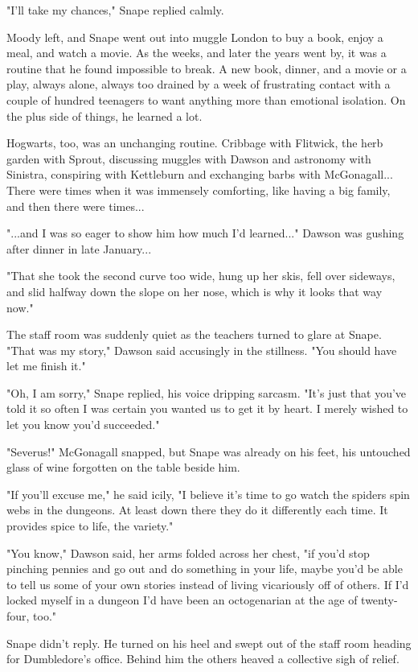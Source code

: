 "I'll take my chances," Snape replied calmly.

Moody left, and Snape went out into muggle London to buy a book, enjoy a meal, and watch a movie. As the weeks, and later the years went by, it was a routine that he found impossible to break. A new book, dinner, and a movie or a play, always alone, always too drained by a week of frustrating contact with a couple of hundred teenagers to want anything more than emotional isolation. On the plus side of things, he learned a lot.

Hogwarts, too, was an unchanging routine. Cribbage with Flitwick, the herb garden with Sprout, discussing muggles with Dawson and astronomy with Sinistra, conspiring with Kettleburn and exchanging barbs with McGonagall... There were times when it was immensely comforting, like having a big family, and then there were times...

"...and I was so eager to show him how much I'd learned..." Dawson was gushing after dinner in late January...

"That she took the second curve too wide, hung up her skis, fell over sideways, and slid halfway down the slope on her nose, which is why it looks that way now."

The staff room was suddenly quiet as the teachers turned to glare at Snape. "That was my story," Dawson said accusingly in the stillness. "You should have let me finish it."

"Oh, I am sorry," Snape replied, his voice dripping sarcasm. "It's just that you've told it so often I was certain you wanted us to get it by heart. I merely wished to let you know you'd succeeded."

"Severus!" McGonagall snapped, but Snape was already on his feet, his untouched glass of wine forgotten on the table beside him.

"If you'll excuse me," he said icily, "I believe it's time to go watch the spiders spin webs in the dungeons. At least down there they do it differently each time. It provides spice to life, the variety."

"You know," Dawson said, her arms folded across her chest, "if you'd stop pinching pennies and go out and do something in your life, maybe you'd be able to tell us some of your own stories instead of living vicariously off of others. If I'd locked myself in a dungeon I'd have been an octogenarian at the age of twenty-four, too."

Snape didn't reply. He turned on his heel and swept out of the staff room heading for Dumbledore's office. Behind him the others heaved a collective sigh of relief.

